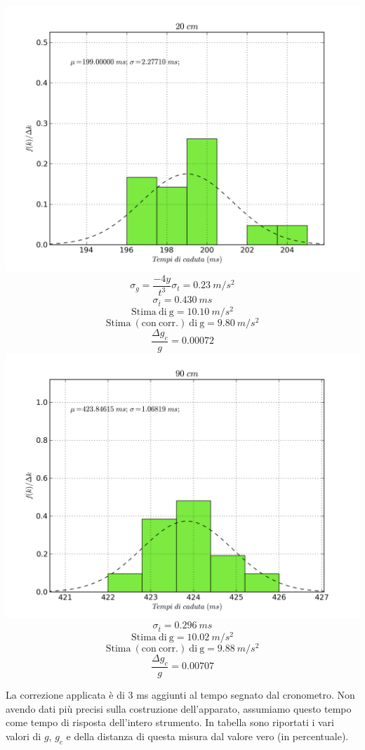 \begin{center}
\includegraphics[scale=0.70]{../grafici/20cm.png}
$$\sigma_g = \frac{-4y}{t^3}\sigma_t = 0.23\  m/s^2$$
$$\sigma_{\bar{t}} = 0.430\ ms$$
$$\mathrm{Stima\ di\ g} = 10.10\ m/s^2$$
$$\mathrm{Stima\ (con\ corr.)\ di\ g} = 9.80\ m/s^2 $$
$$\frac{\Delta g_c}{g} = 0.00072$$
\includegraphics[scale=0.70]{../grafici/90cm.png}
$$\sigma_{\bar{t}} = 0.296\ ms $$
$$\mathrm{Stima\ di\ g} = 10.02\ m/s^2$$
$$\mathrm{Stima\ (con\ corr.)\ di\ g} = 9.88\ m/s^2 $$
$$\frac{\Delta g_c}{g} = 0.00707$$
\end{center}

La correzione applicata è di 3 ms aggiunti al tempo segnato dal cronometro. Non avendo dati più precisi sulla costruzione dell'apparato, assumiamo questo tempo come tempo di risposta dell'intero strumento. In tabella sono riportati i vari valori di $g$, $g_c$ e della distanza di questa misura dal valore vero (in percentuale).

